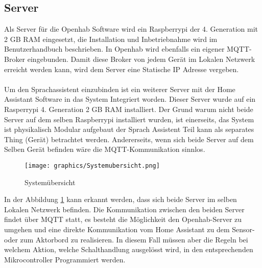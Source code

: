 \subsection{Server}\label{subsec: Server}
Als Server für die Openhab Software wird ein Raspberrypi der 4. Generation mit 2 GB RAM eingesetzt, die Installation und Inbetriebnahme wird im Benutzerhandbuch beschrieben. In Openhab wird ebenfalls ein eigener MQTT-Broker eingebunden. Damit diese Broker von jedem Gerät im Lokalen Netzwerk erreicht werden kann, wird dem Server eine Statische IP Adresse vergeben.\\
\\
Um den Sprachassistent einzubinden ist ein weiterer Server mit der Home Assistant Software in das System Integriert worden. Dieser Server wurde auf ein Rasperrypi 4. Generation 2 GB RAM installiert. Der Grund warum nicht beide Server auf dem selben Raspberrypi installiert wurden, ist einerseits, das System ist physikalisch Modular aufgebaut der Sprach Assistent Teil kann als separates Thing (Gerät) betrachtet werden. Andererseits, wenn sich beide Server auf dem Selben Gerät befinden wäre die MQTT-Kommunikation sinnlos.  



\begin{figure}[H]
	\centering
	\texttt{[image: graphics/Systemubersicht.png]}
	\caption{Systemübersicht}
	\label{pic: Systemübersicht}
\end{figure}   

In der Abbildung \ref{pic: Systemübersicht} kann erkannt werden, dass sich beide Server im selben Lokalen Netzwerk befinden. Die Kommunikation zwischen den beiden Server findet über MQTT statt, es besteht die Möglichkeit den Openhab-Server zu umgehen und eine direkte Kommunikation vom Home Assistant zu dem Sensor- oder zum Aktorbord zu realisieren. In diesem Fall müssen aber die Regeln bei welchem Aktion, welche Schalthandlung ausgelösst wird, in den entsprechenden Mikrocontroller Programmiert werden.

